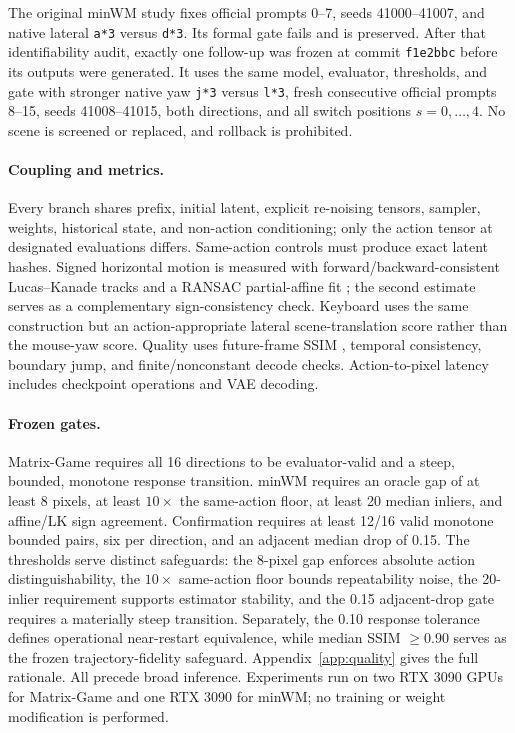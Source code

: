 \documentclass{article}
\begin{document}
The original minWM study fixes official prompts 0--7, seeds 41000--41007, and
native lateral \texttt{a*3} versus \texttt{d*3}. Its formal gate fails and is
preserved. After that identifiability audit, exactly one follow-up was frozen
at commit \texttt{f1e2bbc} before its outputs were generated. It uses the same
model, evaluator, thresholds, and gate with stronger native yaw
\texttt{j*3} versus \texttt{l*3}, fresh consecutive official prompts 8--15,
seeds 41008--41015, both directions, and all switch positions
$s=0,\ldots,4$. No scene is screened or replaced, and rollback is prohibited.

\paragraph{Coupling and metrics.}
Every branch shares prefix, initial latent, explicit re-noising tensors,
sampler, weights, historical state, and non-action conditioning; only the
action tensor at designated evaluations differs. Same-action controls must
produce exact latent hashes. Signed horizontal motion is measured with
forward/backward-consistent Lucas--Kanade tracks \citep{lucas1981iterative}
and a RANSAC partial-affine fit \citep{fischler1981ransac}; the second estimate
serves as a complementary sign-consistency check. Keyboard uses the same construction but
an action-appropriate lateral scene-translation score rather than the
mouse-yaw score. Quality uses future-frame SSIM \citep{wang2004ssim}, temporal
consistency, boundary jump, and finite/nonconstant decode checks.
Action-to-pixel latency includes checkpoint operations and VAE decoding.

\paragraph{Frozen gates.}
Matrix-Game requires all 16 directions to be evaluator-valid and a steep,
bounded, monotone response transition. minWM requires an oracle gap of at least
8 pixels, at least $10\times$ the same-action floor, at least 20 median
inliers, and affine/LK sign agreement. Confirmation requires at least 12/16
valid monotone bounded pairs, six per direction, and an adjacent median drop
of 0.15. The thresholds serve distinct safeguards: the 8-pixel gap enforces
absolute action distinguishability, the $10\times$ same-action floor bounds
repeatability noise, the 20-inlier requirement supports estimator stability,
and the 0.15 adjacent-drop gate requires a materially steep transition.
Separately, the 0.10 response tolerance defines operational near-restart
equivalence, while median SSIM $\geq0.90$ serves as the frozen
trajectory-fidelity safeguard. Appendix~\ref{app:quality} gives the full
rationale. All precede broad inference.
Experiments run on two RTX 3090 GPUs for Matrix-Game and one RTX 3090 for
minWM; no training or weight modification is performed.
\end{document}
